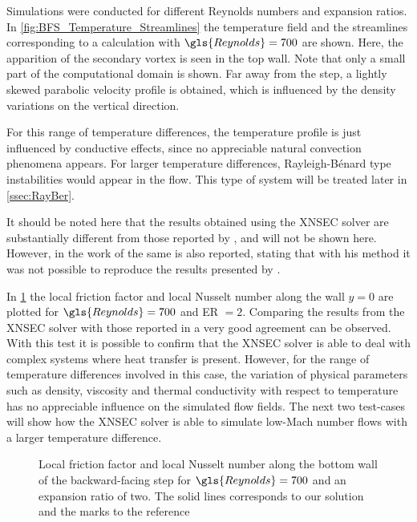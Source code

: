  Simulations were conducted for different Reynolds numbers and expansion ratios. In \cref{fig:BFS_Temperature_Streamlines} the temperature field and the streamlines corresponding to a calculation with $\gls{Reynolds} = 700$ are shown. Here, the apparition of the secondary vortex is seen in the top wall. Note that only a small part of the computational domain is shown. Far away from the step, a lightly skewed parabolic velocity profile is obtained, which is influenced by the density variations on the vertical direction.
 
 For this range of temperature differences, the temperature profile is just influenced by conductive effects, since no appreciable natural convection phenomena appears. For larger temperature differences, Rayleigh-Bénard type instabilities would appear in the flow. This type of system will be treated later in \cref{ssec:RayBer}.
 
It should be noted here that the results obtained using the XNSEC solver are substantially different from those reported by \textcite{xieFluidFlowHeat2016}, and will not be shown here. However, in the work of \textcite{henninkLowMachNumberFlow2022} the same is also reported, stating that with his method it was not possible to reproduce the results presented by \textcite{xieFluidFlowHeat2016}. 

In \cref{fig:fd_Nu_plot} the local friction factor and local Nusselt number along the wall $y = 0$ are plotted for $\gls{Reynolds} = 700$ and ER $= 2$. Comparing the results from the XNSEC solver with those reported in \textcite{henninkLowMachNumberFlow2022} a very good agreement can be observed.
With this test it is possible to confirm that the XNSEC solver is able to deal with complex systems where heat transfer is present. However, for the range of temperature differences involved in this case, the variation of physical parameters such as density, viscosity and thermal conductivity with respect to temperature has no appreciable influence on the simulated flow fields. The next two test-cases will show how the XNSEC solver is able to simulate low-Mach number flows with a larger temperature difference.
\begin{figure}[tb]
	\caption[Local friction factor and local Nusselt number along the bottom wall of the backward-facing step for $\gls{Reynolds} = 700$ and an expansion ratio of two.]{Local friction factor and local Nusselt number along the bottom wall of the backward-facing step for $\gls{Reynolds} = 700$ and an expansion ratio of two. The solid lines corresponds to our solution and the marks to the reference \parencite{henninkLowMachNumberFlow2022}}
	\label{fig:fd_Nu_plot}
\end{figure}%
\FloatBarrier%